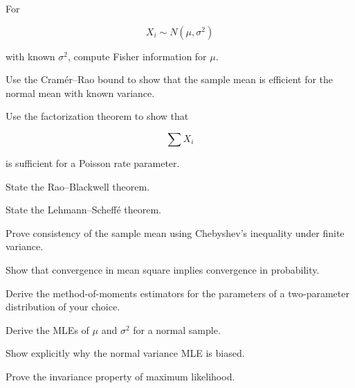 \begin{exercise}[2]
For

\[
X_i\sim N(\mu,\sigma^2)
\]

with known \(\sigma^2\), compute Fisher information for \(\mu\).
\end{exercise}

\begin{exercise}[2]
Use the Cramér--Rao bound to show that the sample mean is efficient for
the normal mean with known variance.
\end{exercise}

\begin{exercise}[2]
Use the factorization theorem to show that

\[
\sum X_i
\]

is sufficient for a Poisson rate parameter.
\end{exercise}

\begin{exercise}[2]
State the Rao--Blackwell theorem.
\end{exercise}

\begin{exercise}[2]
State the Lehmann--Scheffé theorem.
\end{exercise}

\begin{exercise}[3]
Prove consistency of the sample mean using Chebyshev's inequality under
finite variance.
\end{exercise}

\begin{exercise}[3]
Show that convergence in mean square implies convergence in probability.
\end{exercise}

\begin{exercise}[3]
Derive the method-of-moments estimators for the parameters of a
two-parameter distribution of your choice.
\end{exercise}

\begin{exercise}[3]
Derive the MLEs of \(\mu\) and \(\sigma^2\) for a normal sample.
\end{exercise}

\begin{exercise}[3]
Show explicitly why the normal variance MLE is biased.
\end{exercise}

\begin{exercise}[3]
Prove the invariance property of maximum likelihood.
\end{exercise}

